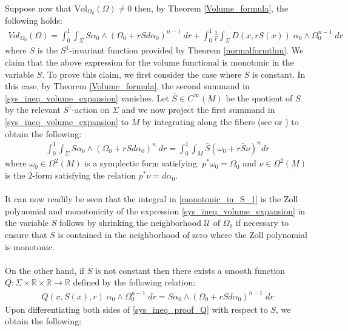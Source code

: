 \documentclass[11pt]{amsart}
\theoremstyle{plain}
\theoremstyle{definition}
\theoremstyle{remark}
\begin{document}
\\
Suppose now that $\text{Vol}_{\Omega_0}(\Omega) \neq 0$ then, by Theorem \ref{Volume_formula}, the following holds:
\begin{align}\label{sys_ineq_volume_expansion}
  Vol_{\Omega_0}(\Omega) =  \int^1_0 \int_{\Sigma}  S\alpha_0 \wedge (\Omega_0 +rSd\alpha_0)^{n-1} \; dr + \int^1_0 \frac{1}{r} \int_{\Sigma} D(x,rS(x)) \; \alpha_0 \wedge \Omega_0^{n-1} \; dr
\end{align}
where $S$ is the $S^1$-invariant function provided by Theorem \ref{normalformthm}. We claim that the above expression for the volume functional is monotonic in the variable $S$. To prove this claim, we first consider the case where $S$ is constant. In this case, by Theorem \ref{Volume_formula}, the second summand in \eqref{sys_ineq_volume_expansion} vanishes. Let $\bar S \in C^{\infty}(M)$ be the quotient of $S$ by the relevant $S^1$-action on $\Sigma$ and we now project the first summand in \eqref{sys_ineq_volume_expansion} to $M$ by integrating along the fibers (see \cite{BottandTu} or \cite[Pg. 386]{B-K-Odd_Symp}) to obtain the following:
\begin{align}\label{monotonic_in_S_1}
  \int^1_0 \int_{\Sigma}  S\alpha_0 \wedge (\Omega_0 +rSd\alpha_0)^n \; dr  = \int^1_0 \int_{M}  \bar{S}(\omega_0 +r\bar{S} \nu)^n dr
\end{align}
where $\omega_0 \in \Omega^2(M)$ is a symplectic form satisfying: $p^*\omega_0 = \Omega_0$ and $\nu \in \Omega^2(M)$ is the $2$-form satisfying the relation $p^*\nu = d\alpha_0$.\\
\\
It can now readily be seen that the integral in \eqref{monotonic_in_S_1} is the Zoll polynomial and monotonicity of the expression \eqref{sys_ineq_volume_expansion} in the variable $S$ follows by shrinking the neighborhood $\mathcal{U}$ of $\Omega_0$ if necessary to ensure that $S$ is contained in the neighborhood of zero where the Zoll polynomial is monotonic.\\
\\
On the other hand, if $S$ is not constant then there exists a smooth function $Q: \Sigma \times
\mathbb{R} \times \mathbb{R} \rightarrow \mathbb{R}$ defined by the following relation:
\begin{align}\label{sys_ineq_proof_Q}
 Q(x,S(x),r) \; \alpha_0 \wedge \Omega_0^{n-1} \; dr = S\alpha_0 \wedge (\Omega_0 +rSd\alpha_0)^{n-1} \; dr
\end{align}
Upon differentiating both sides of \eqref{sys_ineq_proof_Q} with respect to $S$, we obtain the following: 
\end{document}
